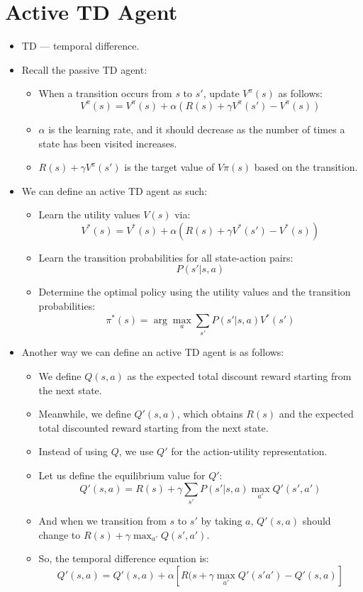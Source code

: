 \documentclass{article}
\begin{document}
\section{Active TD Agent}
\begin{itemize}
    \item TD --- temporal difference.
    \item Recall the passive TD agent:
        \begin{itemize}
            \item When a transition occurs from $s$ to $s'$, update $V^{\pi}(s)$ as follows:
                \[
                    V^\pi(s) = V^\pi(s) + \alpha(R(s) + \gamma V^\pi(s') - V^\pi(s))
                \]
            \item $\alpha$ is the learning rate, and it should decrease as the number of times a state has been visited increases.
            \item $R(s) + \gamma V^\pi(s')$ is the target value of $V\pi(s)$ based on the transition.
        \end{itemize}
    \item We can define an active TD agent as such:
        \begin{itemize}
            \item Learn the utility values $V(s)$ via:
                \[
                    V^*(s) = V^*(s) + \alpha(R(s) + \gamma V^*(s') - V^*(s))
                \]
            \item Learn the transition probabilities for all state-action pairs:
                \[
                    P(s'|s, a)
                \]
            \item Determine the optimal policy using the utility values and the transition probabilities:
                \[
                    \pi^*(s) = \arg \max_a \sum_{s'} P(s' | s, a) V^*(s')
                \]
        \end{itemize}
    \item Another way we can define an active TD agent is as follows:
        \begin{itemize}
            \item We define $Q(s, a)$ as the expected total discount reward starting from the next state.
            \item Meanwhile, we define $Q'(s, a)$, which obtains $R(s)$ and the expected total discounted reward starting from the next state.
            \item Instead of using $Q$, we use $Q'$ for the action-utility representation.
            \item Let us define the equilibrium value for $Q'$:
                \[
                    Q'(s, a) = R(s) + \gamma \sum_{s'} P(s'|s, a) \max_{a'} Q'(s', a')
                \]
            \item And when we transition from $s$ to $s'$ by taking $a$, $Q'(s, a)$ should change to $R(s) + \gamma \max_{a'} Q(s', a')$.
            \item So, the temporal difference equation is:
                \[
                    Q'(s, a) = Q'(s, a) + \alpha [ R(s + \gamma \max_{a'} Q'(s' a') - Q'(s, a) ]
                \]
        \end{itemize}
\end{itemize}
\end{document}

